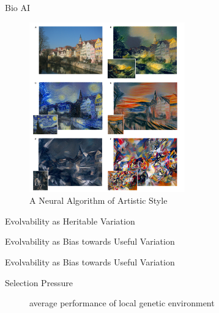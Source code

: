 \begin{frame}{Bio AI}
\begin{figure}
  \includegraphics[width=0.6\textwidth]{img/nn_art_styles.png}
  \captionsetup{singlelinecheck=off,justification=raggedright}
  \caption{A Neural Algorithm of Artistic Style \cite{Gatys2015AStyle}}
\end{figure}
\end{frame}

\begin{frame}{Evolvability as Heritable Variation}
  
\end{frame}

\begin{frame}{Evolvability as Bias towards Useful Variation}
  
\end{frame}

\begin{frame}{Evolvability as Bias towards Useful Variation}
  
\end{frame}

\begin{frame}{Selection Pressure}
\begin{figure}
\resizebox{\textwidth}{!}{%
	
}
\captionsetup{singlelinecheck=off,justification=raggedright}
\caption{average performance of local genetic environment \cite{Reisinger2005TowardsEvolvability}}
\end{figure}
\end{frame}

